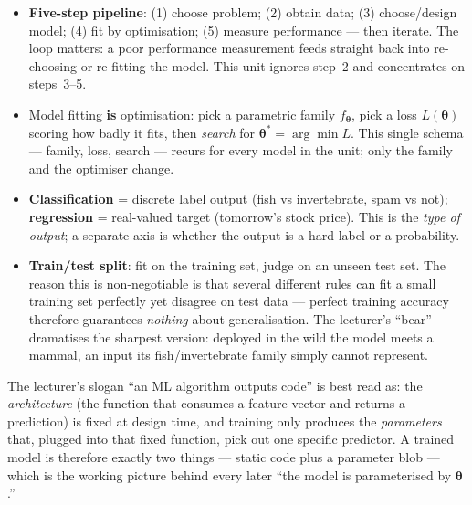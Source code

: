 \documentclass[11pt, a4paper]{article}
\newcommand{\kw}[1]{\textbf{#1}}
\begin{document}
\begin{itemize}
  \item \kw{Five-step pipeline}: (1) choose problem; (2) obtain data; (3) choose/design model;
  (4) fit by optimisation; (5) measure performance — then iterate. The loop matters: a poor
  performance measurement feeds straight back into re-choosing or re-fitting the model. This unit
  ignores step~2 and concentrates on steps~3--5.
  \item Model fitting \kw{is} optimisation: pick a parametric family $f_{\boldsymbol\theta}$, pick a
  loss $L(\boldsymbol\theta)$ scoring how badly it fits, then \emph{search} for
  $\boldsymbol\theta^\ast=\arg\min L$. This single schema — family, loss, search — recurs for every
  model in the unit; only the family and the optimiser change.
  \item \kw{Classification} = discrete label output (fish vs invertebrate, spam vs not); \kw{regression}
  = real-valued target (tomorrow's stock price). This is the \emph{type of output}; a separate axis is
  whether the output is a hard label or a probability.
  \item \kw{Train/test split}: fit on the training set, judge on an unseen test set. The reason this
  is non-negotiable is that several different rules can fit a small training set perfectly yet
  disagree on test data — perfect training accuracy therefore guarantees \emph{nothing} about
  generalisation. The lecturer's ``bear'' dramatises the sharpest version: deployed in the wild the
  model meets a mammal, an input its fish/invertebrate family simply cannot represent.
\end{itemize}

\begin{notebox}
The lecturer's slogan ``an ML algorithm outputs code'' is best read as: the \emph{architecture} (the
function that consumes a feature vector and returns a prediction) is fixed at design time, and
training only produces the \emph{parameters} that, plugged into that fixed function, pick out one
specific predictor. A trained model is therefore exactly two things — static code plus a parameter
blob — which is the working picture behind every later ``the model is parameterised by
$\boldsymbol\theta$.''
\end{notebox}
\end{document}
